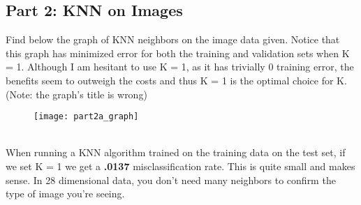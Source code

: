 \documentclass[11pt]{article}
\begin{document}
\subsection*{Part 2: KNN on Images}
Find below the graph of KNN neighbors on the image data given. Notice that this graph has minimized error for both the training and validation sets when K = 1. Although I am hesitant to use K = 1, as it has trivially 0 training error, the benefits seem to outweigh the costs and thus K = 1 is the optimal choice for K. (Note: the graph's title is wrong)   
\begin{figure}[h!]
\texttt{[image: part2a\_graph]}
\centering
\end{figure} \\
When running a KNN algorithm trained on the training data on the test set, if we set K = 1 we get a {\bf.0137} misclassification rate. This is quite small and makes sense. In 28 dimensional data, you don't need many neighbors to confirm the type of image you're seeing. 
\end{document}

